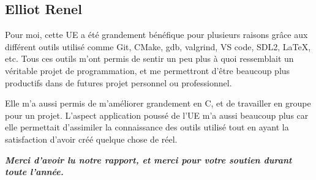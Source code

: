 ﻿\documentclass[12pt]{article}
\begin{document}
\subsection{Elliot Renel}
Pour moi, cette UE a été grandement bénéfique pour plusieurs raisons grâce aux différent outils utilisé comme Git, CMake, gdb, valgrind, VS code, SDL2, \LaTeX, etc. Tous ces outils m’ont permis de sentir un peu plus à quoi ressemblait un véritable projet de programmation, et me permettront d’être beaucoup plus productifs dans de futures projet personnel ou professionnel.


Elle m’a aussi permis de m'améliorer grandement en C, et de travailler en groupe pour un projet. L’aspect application poussé de l’UE m’a aussi beaucoup plus car elle permettait d’assimiler la connaissance des outils utilisé tout en ayant la satisfaction d’avoir créé quelque chose de réel.


\bigskip
\bigskip
\bigskip


\begin{center}
\textit{\textbf{Merci d’avoir lu notre rapport, et merci pour votre soutien durant toute l’année.}}
\end{center}
\end{document}
